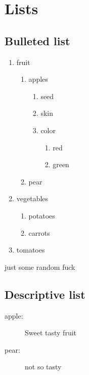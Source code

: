 \section{Lists}
\subsection{Bulleted list}
\renewcommand{\theenumi}{\Alph{enumi}}
\renewcommand{\labelenumi}{\theenumi.)}
\begin{enumerate}[EX I.]
    \item fruit
        \begin{enumerate}[{example} a)]
            \item apples
                \begin{enumerate}
                    \item seed
                    \item skin
                    \item color
                        \begin{enumerate}
                            \item red
                            \item green
                        \end{enumerate}
                \end{enumerate}
            \item[\fbox{!!!}] pear
        \end{enumerate}
    \item vegetables
        \begin{enumerate}
            \item potatoes
            \item carrots
        \end{enumerate}
    \item tomatoes
\end{enumerate}

\theenumi

just some random fuck

\subsection{Descriptive list}
\renewcommand{\descriptionlabel}[1]{\hspace{\labelsep}\itshape #1}
\begin{description}
    \item[apple: ] Sweet tasty fruit
    \item[pear: ] not so tasty \cite{Anything,sw}
\end{description}

